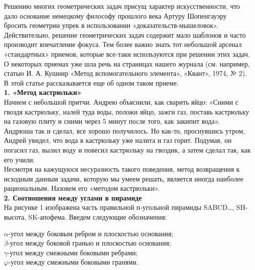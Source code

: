 \documentclass[a4paper,twoside]{article}
\begin{document}
\begin{spacing}{1.1}
\begin{large}
\begin{multicols*}{2}
\noindent Решению многих геометрических задач присущ характер искусственности, что дало основание немецкому философу прошлого века Артуру Шопенгауэру бросить геометрии упрек в использовании «доказательств-мышеловок». Действительно, решение геометрических задач содержит мало шаблонов и часто производит впечатление фокуса. Тем более важно знать тот небольшой арсенал «стандартных» приемов, которые все-таки используются при решении этих задач. О некоторых приемах уже шла речь на страницах нашего журнала (см. например, статью И. А. Кушнир «Метод вспомогательного элемента», «Квант», 1974, № 2). В этой статье рассказывается еще об одном таком приеме.\\


\noindent\textbf{1. «Метод кастрюльки»}\\
Начнем с небольшой притчи. Андрею объяснили, как сварить яйцо: «Сними с гвоздя кастрюльку, налей туда воды, положи яйцо, зажги газ, поставь кастрюльку на газовую плиту и сними через 5 минут после того, как закипит вода». Андрюша так и сделал, все хорошо получилось. Но как-то, проснувшись утром, Андрей увидел, что вода в кастрюльку уже налита и газ горит. Подумав, он погасил газ, вылил воду и повесил кастрюльку на гвоздик, а затем сделал так, как его учили.\\
\indent Несмотря на кажущуюся несуразность такого поведения, метод возвращения к исходным данным задачи, которую мы умеем решать, является иногда наиболее рациональным. Назовем его «методом кастрюльки».\\

\noindent\textbf{2. Соотношения между углами в пирамиде}\\
На рисунке 1 изображена часть правильной п-угольной пирамиды SABCD…, SH-высота, SK-апофема. Введем следующие обозначения:

\leftskip=0.5cm
\noindent$\alpha$-угол между боковым ребром и плоскостью основания;\\
$\beta$-угол между боковой гранью и плоскостью основания;\\
$\gamma$-угол между смежными боковыми ребрами;\\
$\varphi$-угол между смежными боковыми гранями.


\end{multicols*}
\end{large}
\end{spacing}
\end{document}
